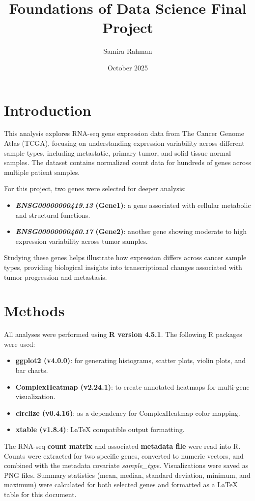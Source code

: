 \documentclass{article}
\title{Foundations of Data Science Final Project}
\author{Samira Rahman}
\date{October 2025}
\begin{document}
\maketitle

\section{Introduction}
This analysis explores RNA-seq gene expression data from The Cancer Genome Atlas (TCGA), focusing on understanding expression variability across different sample types, including metastatic, primary tumor, and solid tissue normal samples. The dataset contains normalized count data for hundreds of genes across multiple patient samples.

For this project, two genes were selected for deeper analysis:
\begin{itemize}
    \item \textbf{\textit{ENSG00000000419.13} (Gene1)}: a gene associated with cellular metabolic and structural functions.
    \item \textbf{\textit{ENSG00000000460.17} (Gene2)}: another gene showing moderate to high expression variability across tumor samples.
\end{itemize}
\noindent
Studying these genes helps illustrate how expression differs across cancer sample types, providing biological insights into transcriptional changes associated with tumor progression and metastasis.


\section{Methods}
All analyses were performed using \textbf{R version 4.5.1}. The following R packages were used:
\begin{itemize}
    \item \textbf{ggplot2 (v4.0.0)}: for generating histograms, scatter plots, violin plots, and bar charts.
    \item \textbf{ComplexHeatmap (v2.24.1)}: to create annotated heatmaps for multi-gene visualization.
    \item \textbf{circlize (v0.4.16)}: as a dependency for ComplexHeatmap color mapping.
    \item \textbf{xtable (v1.8.4)}: LaTeX compatible output formatting.
\end{itemize}
\noindent
The RNA-seq \textbf{count matrix} and associated \textbf{metadata file} were read into R. Counts were extracted for two specific genes, converted to numeric vectors, and combined with the metadata covariate \textit{sample\_type}. Visualizations were saved as PNG files. Summary statistics (mean, median, standard deviation, minimum, and maximum) were calculated for both selected genes and formatted as a LaTeX table for this document.
\end{document}

